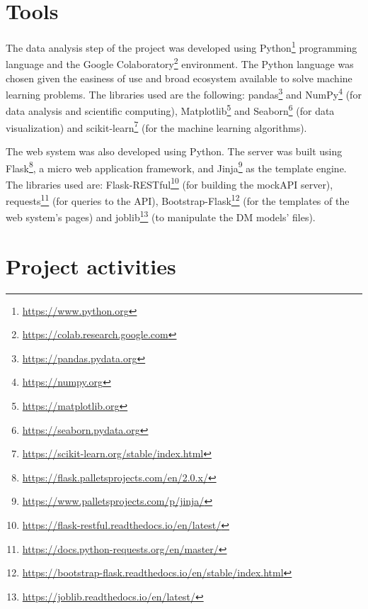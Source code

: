 \section{Tools}

The data analysis step of the project was developed using Python\footnote[1]{\hspace{1mm}\url{https://www.python.org}} programming language and the Google Colaboratory\footnote[2]{\hspace{1mm}\url{https://colab.research.google.com}} environment. The Python language was chosen given the easiness of use and broad ecosystem available to solve machine learning problems. The libraries used are the following: pandas\footnote[3]{\hspace{1mm}\url{https://pandas.pydata.org}} and NumPy\footnote[4]{\hspace{1mm}\url{https://numpy.org}} (for data analysis and scientific computing), Matplotlib\footnote[5]{\hspace{1mm}\url{https://matplotlib.org}} and Seaborn\footnote[6]{\hspace{1mm}\url{https://seaborn.pydata.org}} (for data visualization) and scikit-learn\footnote[7]{\hspace{1mm}\url{https://scikit-learn.org/stable/index.html}} (for the machine learning algorithms).

The web system was also developed using Python. The server was built using Flask\footnote[8]{\hspace{1mm}\url{https://flask.palletsprojects.com/en/2.0.x/}}, a micro web application framework, and Jinja\footnote[9]{\hspace{1mm}\url{https://www.palletsprojects.com/p/jinja/}} as the template engine. The libraries used are: Flask-RESTful\footnote[10]{\hspace{1mm}\url{https://flask-restful.readthedocs.io/en/latest/}} (for building the mockAPI server), requests\footnote[11]{\hspace{1mm}\url{https://docs.python-requests.org/en/master/}} (for queries to the API), Bootstrap-Flask\footnote[12]{\hspace{1mm}\url{https://bootstrap-flask.readthedocs.io/en/stable/index.html}} (for the templates of the web system's pages) and joblib\footnote[13]{\hspace{1mm}\url{https://joblib.readthedocs.io/en/latest/}} (to manipulate the DM models' files).

\section{Project activities}

